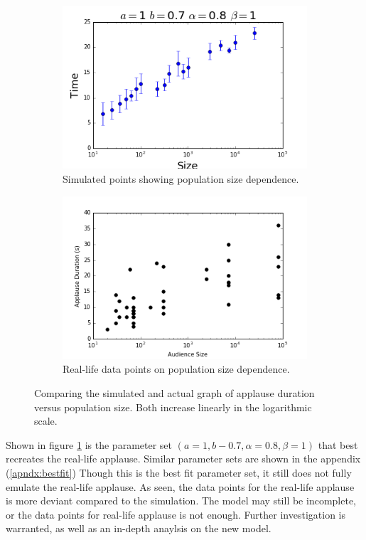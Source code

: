 \begin{figure}[h]
  \centering
  \begin{subfigure}[b]{\linewidth}
    \includegraphics[width=\linewidth]{images/chapter4/confirmA.png}
    \caption{Simulated points showing population size dependence.}
  \end{subfigure}
  \begin{subfigure}[b]{\linewidth}
    \includegraphics[width=\linewidth]{images/chapter4/4.png}
    \caption{Real-life data points on population size dependence.}
  \end{subfigure}
  \caption{Comparing the simulated and actual graph of applause duration versus population size. Both increase linearly in the logarithmic scale.}
  \label{fig:durXsizComp}
\end{figure}

Shown in figure \ref{fig:durXsizComp} is the parameter set $(a=1,b-0.7,\alpha=0.8,\beta=1)$ that best recreates the real-life applause. Similar parameter sets are shown in the appendix (\ref{apndx:bestfit})
Though this is the best fit parameter set, it still does not fully emulate the real-life applause.
As seen, the data points for the real-life applause is more deviant compared to the simulation.
The model may still be incomplete, or the data points for real-life applause is not enough.
Further investigation is warranted, as well as an in-depth anaylsis on the new model.

